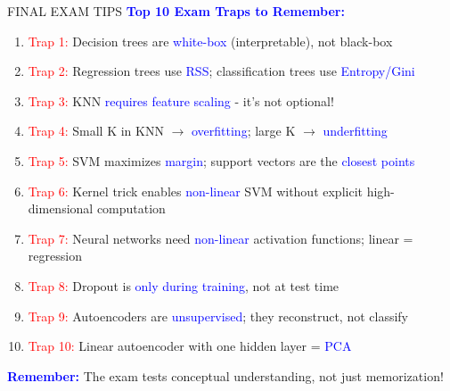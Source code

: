 \documentclass[8pt]{beamer}
\begin{document}
	\begin{frame}{FINAL EXAM TIPS}
		\fontsize{6.5}{7.5}\selectfont
		\textcolor{blue}{\textbf{Top 10 Exam Traps to Remember:}}
		
		\begin{enumerate}
			\item \textcolor{red}{Trap 1:} Decision trees are \textcolor{blue}{white-box} (interpretable), not black-box
			\item \textcolor{red}{Trap 2:} Regression trees use \textcolor{blue}{RSS}; classification trees use \textcolor{blue}{Entropy/Gini}
			\item \textcolor{red}{Trap 3:} KNN \textcolor{blue}{requires feature scaling} - it's not optional!
			\item \textcolor{red}{Trap 4:} Small K in KNN $\rightarrow$ \textcolor{blue}{overfitting}; large K $\rightarrow$ \textcolor{blue}{underfitting}
			\item \textcolor{red}{Trap 5:} SVM maximizes \textcolor{blue}{margin}; support vectors are the \textcolor{blue}{closest points}
			\item \textcolor{red}{Trap 6:} Kernel trick enables \textcolor{blue}{non-linear} SVM without explicit high-dimensional computation
			\item \textcolor{red}{Trap 7:} Neural networks need \textcolor{blue}{non-linear} activation functions; linear = regression
			\item \textcolor{red}{Trap 8:} Dropout is \textcolor{blue}{only during training}, not at test time
			\item \textcolor{red}{Trap 9:} Autoencoders are \textcolor{blue}{unsupervised}; they reconstruct, not classify
			\item \textcolor{red}{Trap 10:} Linear autoencoder with one hidden layer = \textcolor{blue}{PCA}
		\end{enumerate}
		
		\textcolor{blue}{\textbf{Remember:}} The exam tests conceptual understanding, not just memorization!
	\end{frame}
	
\end{document}

